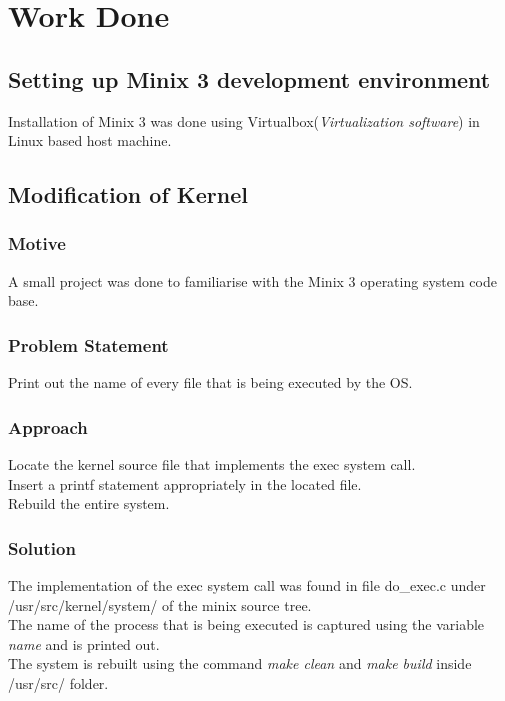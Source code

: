 \chapter{Work Done}

\section{Setting up Minix 3 development environment}
Installation of Minix 3 was done using Virtualbox({\em Virtualization software}) in Linux based host machine.\\
\section{Modification of Kernel}
\subsection{Motive}
A small project was done to familiarise with the Minix 3 operating system code base.
\subsection{Problem Statement}
Print out the name of every file that is being executed by the OS.
\subsection{Approach}
Locate the kernel source file that implements the exec system call.\\	
Insert a printf statement appropriately in the located file.\\
Rebuild the entire system.
\subsection{Solution}
The implementation of the exec system call was found in file do\_exec.c under /usr/src/kernel/system/ of the minix source tree.\\
The name of the process that is being executed is captured using the variable { \em name} and is printed out.\\
The system is rebuilt using the command {\em make clean} and { \em make build} inside /usr/src/ folder. 



